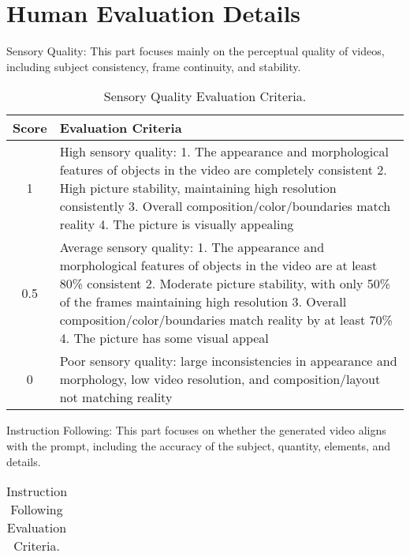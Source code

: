 \documentclass{article} \usepackage{iclr2024_conference,times}
\begin{document}
{\section{Human Evaluation Details}\label{sec:human_evalution}

Sensory Quality: This part focuses mainly on the perceptual quality of videos, including subject consistency, frame continuity, and stability.

\begin{table}[h]
\centering
\caption{Sensory Quality Evaluation Criteria.}
\label{sample-table}
\small

\begin{tabular}{cp{11cm}}
\toprule

\textbf{Score} & \textbf{Evaluation Criteria} \\
\midrule
1  & High sensory quality: 1. The appearance and morphological features of objects in the video are completely consistent 2. High picture stability, maintaining high resolution consistently 3. Overall composition/color/boundaries match reality 4. The picture is visually appealing \\
\midrule
0.5  & Average sensory quality: 1. The appearance and morphological features of objects in the video are at least 80\% consistent 2. Moderate picture stability, with only 50\% of the frames maintaining high resolution 3. Overall composition/color/boundaries match reality by at least 70\% 4. The picture has some visual appeal \\
\midrule
0  & Poor sensory quality: large inconsistencies in appearance and morphology, low video resolution, and composition/layout not matching reality \\

\bottomrule
\end{tabular}
\end{table}

Instruction Following: This part focuses on whether the generated video aligns with the prompt, including the accuracy of the subject, quantity, elements, and details.

\begin{table}[h]
\centering
\caption{Instruction Following Evaluation Criteria.}
\label{sample-table}
\small

\begin{tabular}{cp{11cm}}
\toprule


\end{tabular}
\end{table}}
\end{document}
